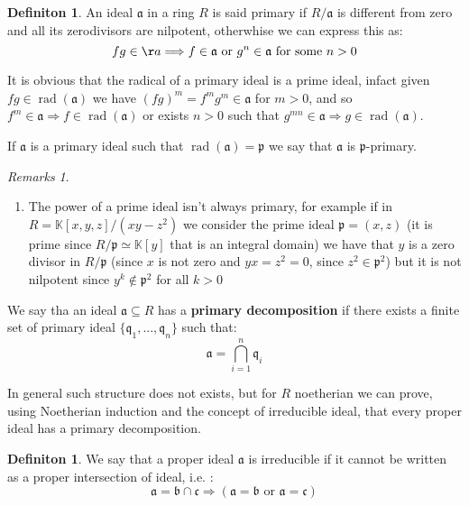 \documentclass[]{book}
\theoremstyle{plain}
\theoremstyle{remark}
\newtheorem{rems}[rem]{Remarks}
\theoremstyle{definition}
\newtheorem{deff}[teo]{Definiton}
\newcommand{\K}{\mathbb{K}}
\newcommand{\p}{\mathfrak{p}}
\newcommand{\q}{\mathfrak{q}}
\newcommand{\A}{\mathfrak{a}}
\newcommand{\B}{\mathfrak{b}}
\newcommand{\Cc}{\mathfrak{c}}
\DeclareMathOperator{\rad}{rad}
\begin{document}
\begin{deff}
	An ideal $ \A $ in a ring $ R $ is said primary if $ R/\A$ is different from zero and all its zerodivisors are nilpotent, otherwhise we can express this as:
	\begin{equation*}
		fg \in \aa \Longrightarrow f \in \A \text{ or } g^n \in \A \text{ for some } n >0
	\end{equation*}
\end{deff}

It is obvious that the radical of a primary ideal is a prime ideal, infact given $ fg \in \rad(\A)  $ we have $ (fg)^m = f^m g^m \in \A $ for $ m>0 $, and so $ f^m \in \A \Rightarrow f \in \rad(\A)$ or exists $ n>0 $ such that $ g^{mn} \in \A \Rightarrow g \in \rad(\A) $.

If $ \A $ is a primary ideal such that $ \rad(\A) = \p $ we say that $ \A $ is {$ \p $-primary}.

\begin{rems} \label{rem:power_primary} \quad 
	\begin{enumerate}
	\item The power of a prime ideal isn't always primary, for example if in $ R = \K[x,y,z] / (xy - z^2) $ we consider the prime ideal $ \p = (x,z) $ (it is prime since $ R / \p \simeq \K[y]$ that is an integral domain) we have that $ y $ is a zero divisor in $R/\p $ (since $ x $ is not zero and $ yx = z^2 = 0 $, since $z^2 \in \p^2 $) but it is not nilpotent since $ y^k \not \in \p^2 $ for all $ k>0 $
	\end{enumerate}
\end{rems}

We say tha an ideal $ \A \subseteq R $ has a \textbf{primary decomposition}  if there exists a finite set of primary ideal $ \{ \q_1 , ... , \q_n\} $ such that:
\begin{equation*}
	\A = \bigcap_{i=1}^n \q_i
\end{equation*}

In general such structure does not exists, but for $ R $ noetherian we can prove, using Noetherian induction and the concept of irreducible ideal, that every proper ideal has a primary decomposition.

\begin{deff}
	We say that a proper ideal $ \A $ is irreducible if it cannot be written as a proper intersection of ideal, i.e. :
	\begin{equation*}
		\A = \B \cap \Cc \Longrightarrow (\A = \B \text{ or } \A = \Cc)
	\end{equation*}
\end{deff}
\end{document}
